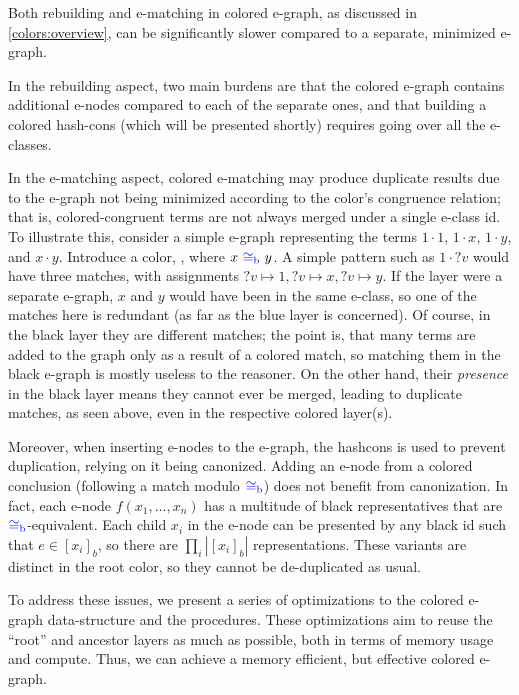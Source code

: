 Both rebuilding and e-matching in colored e-graph, as discussed in \autoref{colors:overview}, can be significantly slower compared to a separate, minimized e-graph.

In the rebuilding aspect,
two main burdens are that the colored e-graph contains additional e-nodes compared to each of the separate ones, and that building a colored hash-cons (which will be presented shortly) requires going over all the e-classes.

In the e-matching aspect, colored e-matching
may produce duplicate results due to the e-graph not being minimized according to the color's congruence relation;
that is, colored-congruent terms are not always merged under a single e-class id.
To illustrate this, consider a simple e-graph
representing the terms $1\cdot 1$, $1\cdot x$, $1\cdot y$, and $x\cdot y$.
Introduce a color, \cblue, where $x {~\color{blue}\cong_{\mathrm{b}}\,\,} y$.
A simple pattern such as $1\cdot ?v$ would have three matches, with assignments $?v \mapsto 1, ?v\mapsto x, ?v\mapsto y$.
If the \cblue layer were a separate e-graph, $x$ and $y$ would have been in the same e-class,
so one of the matches here is redundant (as far as the blue layer is concerned).
Of course, in the black layer they are different matches; the point is, that many terms are added to the graph only as a result of a colored match,
so matching them in the black e-graph is mostly useless to the reasoner.
On the other hand, their \emph{presence} in the black layer means they cannot ever be merged, leading to duplicate matches, as seen above, even in the respective colored layer(s).

Moreover, when inserting e-nodes to the e-graph, the hash\-cons is used to prevent duplication, relying on it being canonized.
Adding an e-node from a colored conclusion
(following a match modulo ${\color{blue}\cong_{\mathrm{b}}}$) does not benefit from canonization.
In fact, each e-node $f(x_1,\dots,x_n)$ has a multitude of black representatives that are ${\color{blue}\cong_{\mathrm{b}}}$-equivalent. 
Each child $x_i$ in the e-node can be presented by any black id such that $e \in [x_i]_b$, so there are $\prod_i |[x_i]_b|$ representations.
These variants are distinct in the root color,
so they cannot be de-duplicated as usual.

To address these issues, we present a series of optimizations to the colored e-graph data-structure and the procedures. 
These optimizations aim to reuse the ``root'' and ancestor layers as much as possible, both in terms of memory usage and compute.
Thus, we can achieve a memory efficient, but effective colored e-graph. 

